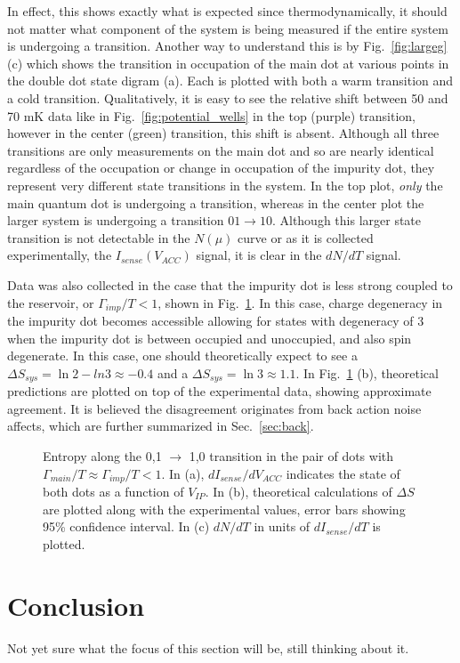 In effect, this shows exactly what is expected since thermodynamically, it should not matter what component of the system is being measured if the entire system is undergoing a transition. Another way to understand this is by Fig.~\ref{fig:largeg} (c) which shows the transition in occupation of the main dot at various points in the double dot state digram (a). Each is plotted with both a warm transition and a cold transition. Qualitatively, it is easy to see the relative shift between 50 and 70 mK data like in Fig.~\ref{fig:potential_wells} in the top (purple) transition, however in the center (green) transition, this shift is absent. Although all three transitions are only measurements on the main dot and so are nearly identical regardless of the occupation or change in occupation of the impurity dot, they represent very different state transitions in the system. In the top plot, \textit{only} the main quantum dot is undergoing a transition, whereas in the center plot the larger system is undergoing a transition $01 \to 10$. Although this larger state transition is not detectable in the $N(\mu)$ curve or as it is collected experimentally, the $I_{sense} (V_{ACC})$ signal, it is clear in the $dN/dT$ signal. 

Data was also collected in the case that the impurity dot is less strong coupled to the reservoir, or $\Gamma_{imp}/T < 1$, shown in Fig.~\ref{fig:smallg}. In this case, charge degeneracy in the impurity dot becomes accessible allowing for states with degeneracy of 3 when the impurity dot is between occupied and unoccupied, and also spin degenerate. In this case, one should theoretically expect to see a $\Delta S_{sys} = \ln 2 - ln 3 \approx -0.4$ and a $\Delta S_{sys} = \ln3 \approx 1.1$. In Fig.~\ref{fig:smallg} (b), theoretical predictions are plotted on top of the experimental data, showing approximate agreement. It is believed the disagreement originates from back action noise affects, which are further summarized in Sec.~\ref{sec:back}.

\begin{figure}[h]
\centering
{}
\caption{Entropy along the 0,1 $\to$ 1,0 transition in the pair of dots with $\Gamma_{main}/T \approx \Gamma_{imp}/T < 1$. In (a), $dI_{sense}/dV_{ACC}$ indicates the state of both dots as a function of $V_{IP}$. In (b), theoretical calculations of $\Delta S$ are plotted along with the experimental values, error bars showing 95\% confidence interval. In (c) $dN/dT$ in units of $dI_{sense}/dT$ is plotted.}
\label{fig:smallg}      
\end{figure}


\section{Conclusion}
\label{sec:conclusion}

Not yet sure what the focus of this section will be, still thinking about it.




\endinput

Any text after an \endinput is ignored.
You could put scraps here or things in progress.
